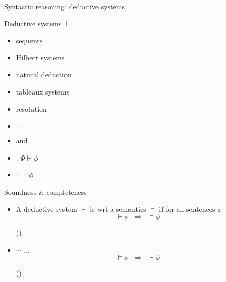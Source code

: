 \documentclass{beamer}
\begin{document}
\begin{slide}{Syntactic reasoning: deductive systems}\label{s:3}
\small

\begin{block}{Deductive systems $\vdash$}
\begin{itemize}
\item sequents
\item Hilbert systems
\item natural deduction
\item tableaux systems
\item resolution
\item $\cdots$
\end{itemize}
\end{block}


\begin{flushright}
\begin{itemize}
\item {} and 
\item {}: $\Phi \vdash \phi$
\item {}: $\vdash \phi$
\end{itemize}
\end{flushright}

\end{slide}

\begin{slide}{Soundness \& completeness}\label{s:4}
\small

\begin{itemize}
\item A deductive system $\vdash$ is  wrt a semantics $\models$ if for all sentences $\phi$
$$ \vdash \phi\; \; \Longrightarrow\; \; \models \phi$$
\begin{flushright}
()
\end{flushright}
\item $\cdots$  ...
$$ \models \phi\; \;  \Longrightarrow\; \;  \vdash \phi$$
\begin{flushright}
()
\end{flushright}
 \end{itemize}

\end{slide}
\end{document}
